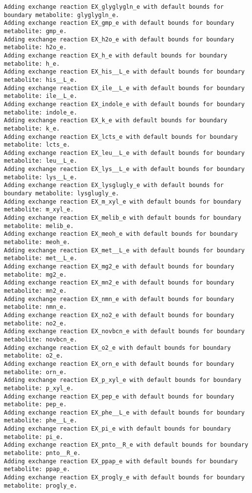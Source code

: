 \documentclass[
  letterpaper,
  DIV=11,
  numbers=noendperiod]{scrartcl}
\begin{document}
\begin{verbatim}
Adding exchange reaction EX_glyglygln_e with default bounds for boundary metabolite: glyglygln_e.
Adding exchange reaction EX_gmp_e with default bounds for boundary metabolite: gmp_e.
Adding exchange reaction EX_h2o_e with default bounds for boundary metabolite: h2o_e.
Adding exchange reaction EX_h_e with default bounds for boundary metabolite: h_e.
Adding exchange reaction EX_his__L_e with default bounds for boundary metabolite: his__L_e.
Adding exchange reaction EX_ile__L_e with default bounds for boundary metabolite: ile__L_e.
Adding exchange reaction EX_indole_e with default bounds for boundary metabolite: indole_e.
Adding exchange reaction EX_k_e with default bounds for boundary metabolite: k_e.
Adding exchange reaction EX_lcts_e with default bounds for boundary metabolite: lcts_e.
Adding exchange reaction EX_leu__L_e with default bounds for boundary metabolite: leu__L_e.
Adding exchange reaction EX_lys__L_e with default bounds for boundary metabolite: lys__L_e.
Adding exchange reaction EX_lysglugly_e with default bounds for boundary metabolite: lysglugly_e.
Adding exchange reaction EX_m_xyl_e with default bounds for boundary metabolite: m_xyl_e.
Adding exchange reaction EX_melib_e with default bounds for boundary metabolite: melib_e.
Adding exchange reaction EX_meoh_e with default bounds for boundary metabolite: meoh_e.
Adding exchange reaction EX_met__L_e with default bounds for boundary metabolite: met__L_e.
Adding exchange reaction EX_mg2_e with default bounds for boundary metabolite: mg2_e.
Adding exchange reaction EX_mn2_e with default bounds for boundary metabolite: mn2_e.
Adding exchange reaction EX_nmn_e with default bounds for boundary metabolite: nmn_e.
Adding exchange reaction EX_no2_e with default bounds for boundary metabolite: no2_e.
Adding exchange reaction EX_novbcn_e with default bounds for boundary metabolite: novbcn_e.
Adding exchange reaction EX_o2_e with default bounds for boundary metabolite: o2_e.
Adding exchange reaction EX_orn_e with default bounds for boundary metabolite: orn_e.
Adding exchange reaction EX_p_xyl_e with default bounds for boundary metabolite: p_xyl_e.
Adding exchange reaction EX_pep_e with default bounds for boundary metabolite: pep_e.
Adding exchange reaction EX_phe__L_e with default bounds for boundary metabolite: phe__L_e.
Adding exchange reaction EX_pi_e with default bounds for boundary metabolite: pi_e.
Adding exchange reaction EX_pnto__R_e with default bounds for boundary metabolite: pnto__R_e.
Adding exchange reaction EX_ppap_e with default bounds for boundary metabolite: ppap_e.
Adding exchange reaction EX_progly_e with default bounds for boundary metabolite: progly_e.

\end{verbatim}
\end{document}
